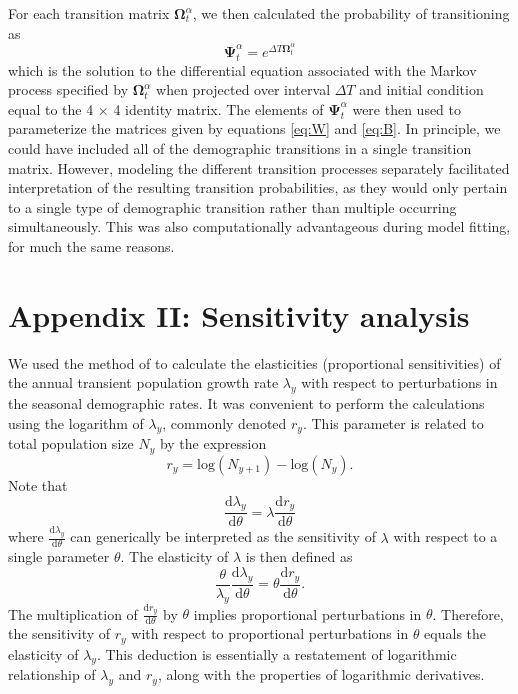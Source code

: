 For each transition matrix $\boldsymbol\Omega^{\alpha}_t$, 
we then calculated the probability of transitioning as
%
\begin{equation} \label{eq:Psi}
\boldsymbol\Psi^{\alpha}_t = e^{\Delta T\boldsymbol\Omega^{\alpha}_t}
\end{equation}
%
which is the solution to the differential equation associated with the Markov process
specified by $\boldsymbol\Omega^{\alpha}_t$ 
when projected over interval $\Delta T$ 
and initial condition equal to the 4 $\times$ 4 identity matrix.
The elements of $\boldsymbol\Psi^{\alpha}_t$ were then used to parameterize
the matrices given by equations \ref{eq:W} and \ref{eq:B}.
In principle, we could have included all of the demographic transitions in a single
transition matrix. 
However, modeling the different transition processes separately facilitated interpretation
of the resulting transition probabilities, as they would only pertain to a single type 
of demographic transition rather than multiple occurring simultaneously.
This was also computationally advantageous during model fitting, 
for much the same reasons.



\section*{Appendix II: Sensitivity analysis} 

We used the method of \cite{caswell2007sensitivity} to calculate the elasticities 
(proportional sensitivities) of the annual transient population growth rate $\lambda_y$
with respect to perturbations in the seasonal demographic rates.
It was convenient to perform the calculations using the logarithm of $\lambda_y$,
commonly denoted $r_y$.
This parameter is related to total population size $N_y$ by the expression
%
\begin{equation} \label{eq:r}
r_y = \text{log}\left(N_{y+1}\right) - \text{log}\left({N_y}\right).
\end{equation}
%
Note that
%
\begin{equation} \label{eq:lsens}
\frac{\text{d}\lambda_y}{\text{d}\theta} = \lambda \frac{\text{d}r_y}{\text{d}\theta}
\end{equation}
%
where $\frac{\text{d}\lambda_y}{\text{d}\theta}$ can generically be interpreted
as the sensitivity of $\lambda$ with respect to a single parameter $\theta$.
The elasticity of $\lambda$ is then defined as
%
\begin{equation} \label{eq:lelas}
\frac{\theta}{\lambda_y} \frac{\text{d}\lambda_y}{\text{d}\theta} = 
        \theta\frac{\text{d}r_y}{\text{d}\theta}.
\end{equation}
%
The multiplication of $\frac{\text{d}r_y}{\text{d}\theta}$ by $\theta$  
implies proportional perturbations in $\theta$.
Therefore, the sensitivity of $r_y$ with respect to proportional perturbations in $\theta$
equals the elasticity of $\lambda_y$.
This deduction is essentially a restatement of logarithmic relationship of $\lambda_y$
and $r_y$, along with the properties of logarithmic derivatives.

